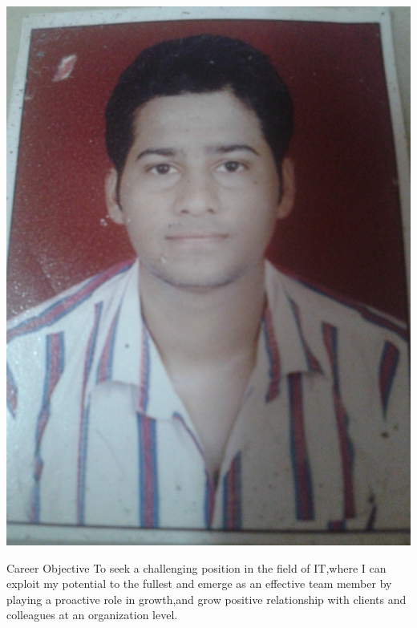 \documentclass{resume} %
\begin{document}
\includegraphics[scale=0.09,angle=270]{4}


\begin{rSection}{Career Objective}
	To seek a challenging  position in the field of IT,where I can exploit my  potential to the fullest and emerge as an effective team member by playing  a proactive role in growth,and grow positive relationship with clients and colleagues at an organization level.
\end{rSection}
\end{document}
